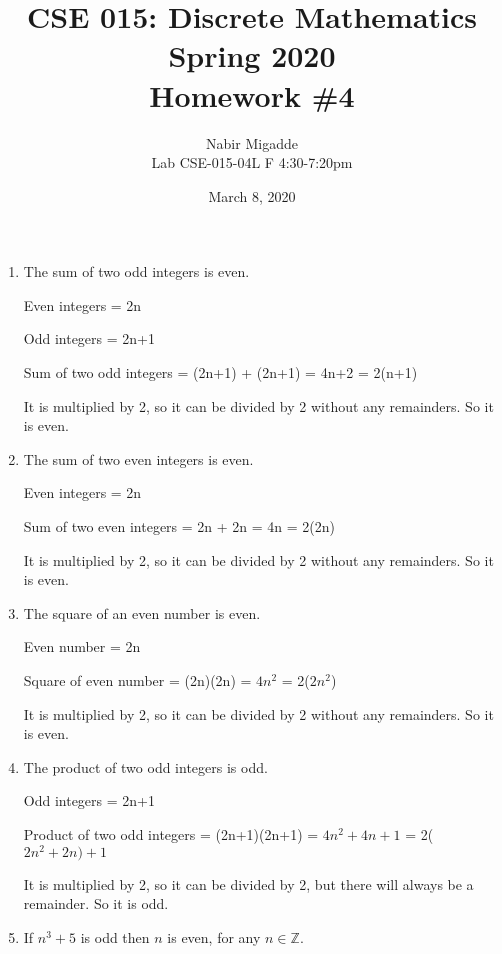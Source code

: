 \documentclass[11pt]{article}
\begin{document}
\author{Nabir Migadde\\
Lab CSE-015-04L F 4:30-7:20pm}

\title{CSE 015: Discrete Mathematics\\
Spring 2020\\
Homework \#4\\}

\date{March 8, 2020}
\maketitle
\begin{enumerate}

\item
The sum of two odd integers is even.

Even integers = 2n

Odd integers = 2n+1

Sum of two odd integers = (2n+1) + (2n+1) = 4n+2 = 2(n+1)

It is multiplied by 2, so it can be divided by 2 without any remainders. So it is even.

\item
The sum of two even integers is even.

Even integers = 2n

Sum of two even integers = 2n + 2n = 4n = 2(2n)

It is multiplied by 2, so it can be divided by 2 without any remainders. So it is even.

\item
The square of an even number is even.

Even number = 2n

Square of even number = (2n)(2n) = $4n^2$ = 2($2n^2$)

It is multiplied by 2, so it can be divided by 2 without any remainders. So it is even.

\item
The product of two odd integers is odd.

Odd integers = 2n+1

Product of two odd integers = (2n+1)(2n+1) = $4n^2+4n+1$ = 2($2n^2+2n)+1$

It is multiplied by 2, so it can be divided by 2, but there will always be a remainder. So it is odd.

\item
If $n^3+5$ is odd then $n$ is even, for any $n \in \mathbb{Z}$.


\end{enumerate}
\end{document}
